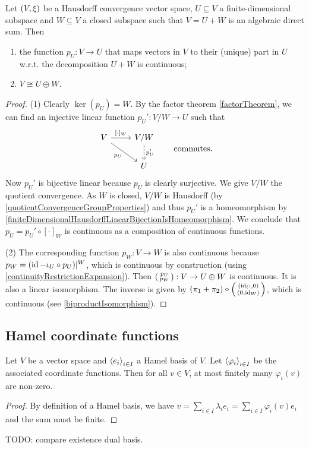 \begin{proposition}
Let $\left( V,\xi \right)$ be a Hausdorff convergence vector space, $U\subseteq V$ a finite-dimensional subspace and $W\subseteq V$ a closed subspace such that $V= U+W$ is an algebraic direct sum. Then
\begin{enumerate}
\item the function $p_U: V\to U$ that maps vectors in $V$ to their (unique) part in $U$ w.r.t. the decomposition $U+W$ is continuous;
\item $V \cong U\oplus W$.
\end{enumerate}
\end{proposition}
\begin{proof}
(1) Clearly $\ker(p_U) = W$. By the factor theorem \ref{factorTheorem}, we can find an injective linear function $p_U': V/W\to U$ such that
\[ \begin{tikzcd}
V \arrow[r, "{[\cdot]_{W}}"] \arrow[dr, swap, "p_U"] & V/W \arrow[d, dashed, "{p_U'}"] \\
& U
\end{tikzcd} \qquad\text{commutes.} \]
Now $p_U'$ is bijective linear because $p_U$ is clearly surjective. We give $V/W$ the quotient convergence. As $W$ is closed, $V/W$ is Hausdorff (by \ref{quotientConvergenceGroupProperties}) and thus $p_U'$ is a homeomorphism by \ref{finiteDimensionalHausdorffLinearBijectionIsHomeomorphism}. We conclude that $p_U= p_U'\circ [\cdot]_{W}$ is continuous as a composition of continuous functions.

(2) The corresponding function $p_W: V\to W$ is also continuous because $p_W = (\operatorname{id} - \iota_U \circ p_U)|^W$, which is continuous by construction (using \ref{continuityRestrictionExpansion}). Then $\left(\begin{smallmatrix} p_U \\ p_W \end{smallmatrix}\right):V\to U\oplus W$ is continuous. It is also a linear isomorphism. The inverse is given by $(\pi_1 + \pi_2) \circ \left(\begin{smallmatrix} (\operatorname{id}_U, 0) \\ (0, \operatorname{id}_W) \end{smallmatrix}\right)$, which is continuous (see \ref{biproductIsomorphism}).
\end{proof}

\subsection{Hamel coordinate functions}
\begin{lemma} \label{finiteNonZeroHamelCoordinateFunctions}
Let $V$ be a vector space and $\left\langle e_i \right\rangle_{i\in I}$ a Hamel basis of $V$. Let $\left\langle \varphi_i \right\rangle_{i\in I}$ be the associated coordinate functions. Then for all $v\in V$, at most finitely many $\varphi_i(v)$ are non-zero.
\end{lemma}
\begin{proof}
By definition of a Hamel basis, we have $v = \sum_{i\in I}\lambda_i e_i = \sum_{i\in I}\varphi_i(v) e_i$ and the sum must be finite.
\end{proof}
TODO: compare existence dual basis.

